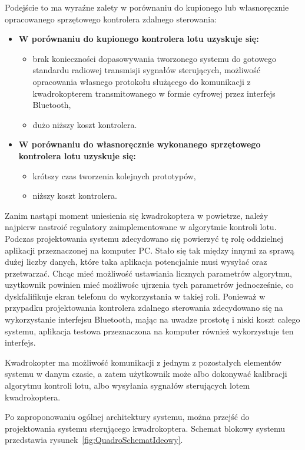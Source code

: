 Podejście to ma wyraźne zalety w porównaniu do kupionego lub własnoręcznie opracowanego sprzętowego kontrolera zdalnego sterowania:

\begin{itemize}
	\item \textbf{W porównaniu do kupionego kontrolera lotu uzyskuje się:}
		\begin{itemize}
			\item brak konieczności dopasowywania tworzonego systemu do gotowego standardu radiowej transmisji sygnałów sterujących, możliwość opracowania własnego protokołu służącego do komunikacji z kwadrokopterem transmitowanego w formie cyfrowej przez interfejs Bluetooth,
			\item dużo niższy koszt kontrolera.
		\end{itemize}
	\item \textbf{W porównaniu do własnoręcznie wykonanego sprzętowego kontrolera lotu uzyskuje się:}
		\begin{itemize}
			\item krótszy czas tworzenia kolejnych prototypów,
			\item niższy koszt kontrolera.
		\end{itemize}
\end{itemize}

Zanim nastąpi moment uniesienia się kwadrokoptera w powietrze, należy najpierw nastroić regulatory zaimplementowane w algorytmie kontroli lotu. Podczas projektowania systemu zdecydowano się powierzyć tę rolę oddzielnej aplikacji przeznaczonej na komputer PC. Stało się tak między innymi za sprawą dużej liczby danych, które taka aplikacja potencjalnie musi wysyłać oraz przetwarzać. Chcąc mieć możliwość ustawiania licznych parametrów algorytmu, uzytkownik powinien mieć możliwośc ujrzenia tych parametrów jednocześnie, co dyskfalifikuje ekran telefonu do wykorzystania w takiej roli. Ponieważ w przypadku projektowania kontrolera zdalnego sterowania zdecydowano się na wykorzystanie interfejsu Bluetooth, mając na uwadze prostotę i niski koszt całego systemu, aplikacja testowa przeznaczona na komputer również wykorzystuje ten interfejs.

Kwadrokopter ma możliwość komunikacji z jednym z pozostałych elementów systemu w danym czasie, a zatem użytkownik może albo dokonywać kalibracji algorytmu kontroli lotu, albo wysyłania sygnałów sterujących lotem kwadrokoptera.

Po zaproponowaniu ogólnej architektury systemu, można przejść do projektowania systemu sterującego kwadrokoptera. Schemat blokowy systemu przedstawia rysunek~\ref{fig:QuadroSchematIdeowy}.

